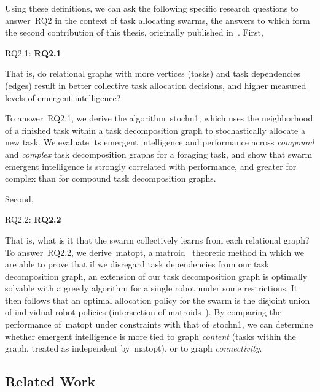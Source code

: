 Using these definitions, we can ask the following specific research questions to
answer~\gls{RQ2} in the context of task allocating swarms, the answers to which
form the second contribution of this thesis, originally published
in~\cite{Harwell2020a}. First,

\medskip\noindent
\gls{RQ2.1}: \textbf{\Glsdesc{RQ2.1}}
\medskip

\noindent
That is, do relational graphs with more vertices (tasks) and task dependencies
(edges) result in better collective task allocation decisions, and higher
measured levels of emergent intelligence?

To answer~\gls{RQ2.1}, we derive the algorithm~\gls{stochn1}, which uses the
neighborhood of a finished task within a task decomposition graph to
stochastically allocate a new task. We evaluate its emergent intelligence and
performance across \emph{compound} and \emph{complex} task decomposition graphs
for a foraging task, and show that swarm emergent intelligence is strongly
correlated with performance, and greater for complex than for compound task
decomposition graphs.

Second,

\medskip\noindent
\gls{RQ2.2}: \textbf{\Glsdesc{RQ2.2}}
\medskip

\noindent
That is, what is it that the swarm collectively learns from each relational
graph?  To answer~\gls{RQ2.2}, we derive~\gls{matopt}, a
matroid~\cite{Tutte1959,Whitney1935,Oxley2006} theoretic method in which we are
able to prove that if we disregard task dependencies from our task decomposition
graph, an extension of our task decomposition graph is optimally solvable with a
greedy algorithm for a single robot under some restrictions. It then follows
that an optimal allocation policy for the swarm is the disjoint union of
individual robot policies (intersection of matroids~\cite{Williams2017}). By
comparing the performance of~\gls{matopt} under constraints with that
of~\gls{stochn1}, we can determine whether emergent intelligence is more tied
to graph \emph{content} (tasks within the graph, treated as independent
by~\gls{matopt}), or to graph \emph{connectivity}.


\subsection{Related Work}\label{RQ2:sec:rw}
%

